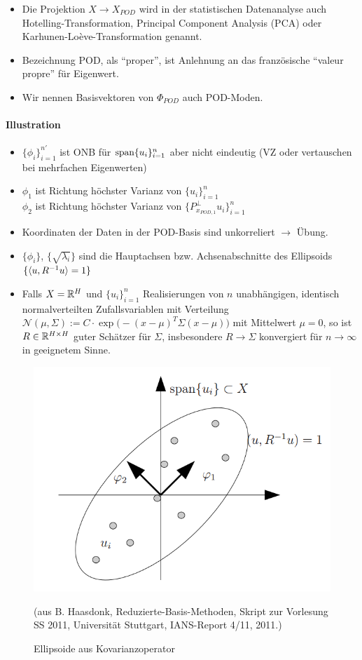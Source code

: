 \begin{bem} \beginwithlistbem
	\begin{itemize}
		\item Die Projektion $X \rightarrow X_{POD}$ wird in der statistischen Datenanalyse auch Hotelling-Transformation, Principal Component Analysis (PCA) oder Karhunen-Loève-Trans\-formation genannt.
		\item Bezeichnung POD, als ``proper'', ist Anlehnung an das französische ``valeur propre'' für Eigenwert.
		\item Wir nennen Basisvektoren von $\Phi_{POD}$ auch POD-Moden.
	\end{itemize}
\end{bem}

\paragraph*{Illustration}

\begin{itemize}
	\item $\{\phi_i\}_{i=1}^{n'}$ ist ONB für $\operatorname{span} \{u_i\}_{i=1}^n$ aber nicht eindeutig (VZ oder vertauschen bei mehrfachen Eigenwerten)
	\item $\phi_1$ ist Richtung höchster Varianz von $\{u_i\}_{i=1}^n$ \\
	$\phi_2$ ist Richtung höchster Varianz von $\{P_{x_{POD,1}}^\perp u_i\}_{i=1}^n$
	\item Koordinaten der Daten in der POD-Basis sind unkorreliert $\rightarrow$ Übung.
	\item $\{\phi_i\}$, $\{\sqrt{\lambda_i}\}$ sind die Hauptachsen bzw. Achsenabschnitte des Ellipsoids $\{\langle u, R^{-1}u \rangle=1\}$
	\item Falls $X=\mathbb{R}^H$ und $\{u_i\}_{i=1}^n$ Realisierungen von $n$ unabhängigen, identisch normalverteilten Zufallsvariablen mit Verteilung $\mathcal{N}(\mu,\Sigma) := C \cdot \exp \big(-(x-\mu)^T \Sigma (x-\mu) \big)$ mit Mittelwert $\mu = 0$, so ist $R \in \mathbb{R}^{H \times H}$ guter Schätzer für $\Sigma$, insbesondere $R \rightarrow \Sigma$ konvergiert für $n \rightarrow \infty$ in geeignetem Sinne.
\end{itemize}

\begin{figure}[H]
  \centering\small
    \includegraphics[width = 0.5 \textwidth]{Bilder/IllustrationPOD.png}
  \caption{Ellipsoide aus Kovarianzoperator}{(aus B. Haasdonk, Reduzierte-Basis-Methoden, Skript zur Vorlesung SS 2011, Universität Stuttgart, IANS-Report 4/11, 2011.)}
  \label{fig:IllustrationPOD}
\end{figure}

